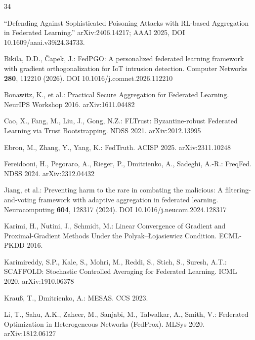 \documentclass{llncs}
\begin{document}

\begin{thebibliography}{34}

 ``Defending Against Sophisticated Poisoning Attacks with RL-based Aggregation in Federated Learning.'' arXiv:2406.14217; AAAI 2025, DOI 10.1609/aaai.v39i24.34733.

 Bikila, D.D., \v{C}apek, J.: FedPGO: A personalized federated learning framework with gradient orthogonalization for IoT intrusion detection. Computer Networks \textbf{280}, 112210 (2026). DOI 10.1016/j.comnet.2026.112210

 Bonawitz, K., et al.: Practical Secure Aggregation for Federated Learning. NeurIPS Workshop 2016. arXiv:1611.04482

 Cao, X., Fang, M., Liu, J., Gong, N.Z.: FLTrust: Byzantine-robust Federated Learning via Trust Bootstrapping. NDSS 2021. arXiv:2012.13995

 Ebron, M., Zhang, Y., Yang, K.: FedTruth. ACISP 2025. arXiv:2311.10248

 Fereidooni, H., Pegoraro, A., Rieger, P., Dmitrienko, A., Sadeghi, A.-R.: FreqFed. NDSS 2024. arXiv:2312.04432

 Jiang, et al.: Preventing harm to the rare in combating the malicious: A filtering-and-voting framework with adaptive aggregation in federated learning. Neurocomputing \textbf{604}, 128317 (2024). DOI 10.1016/j.neucom.2024.128317

 Karimi, H., Nutini, J., Schmidt, M.: Linear Convergence of Gradient and Proximal-Gradient Methods Under the Polyak--{\L}ojasiewicz Condition. ECML-PKDD 2016.

 Karimireddy, S.P., Kale, S., Mohri, M., Reddi, S., Stich, S., Suresh, A.T.: SCAFFOLD: Stochastic Controlled Averaging for Federated Learning. ICML 2020. arXiv:1910.06378

 Krau{\ss}, T., Dmitrienko, A.: MESAS. CCS 2023.

 Li, T., Sahu, A.K., Zaheer, M., Sanjabi, M., Talwalkar, A., Smith, V.: Federated Optimization in Heterogeneous Networks (FedProx). MLSys 2020. arXiv:1812.06127


\end{thebibliography}
\end{document}
